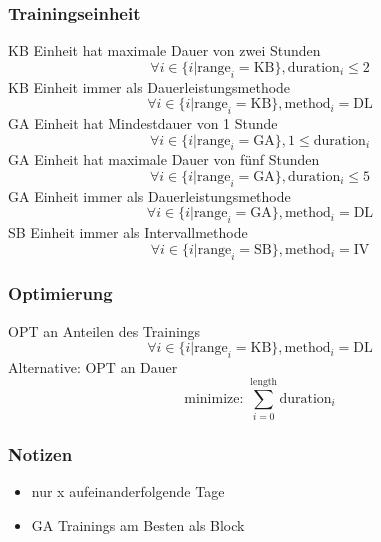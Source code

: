     \subsubsection{Trainingseinheit}
    KB Einheit hat maximale Dauer von zwei Stunden
        \begin{equation}
            \forall i \in \{i | \text{range}_i = \text{KB}\}, \text{duration}_i \leq 2
        \end{equation}
    KB Einheit immer als Dauerleistungsmethode
        \begin{equation}
            \forall i \in \{i | \text{range}_i = \text{KB}\}, \text{method}_i = \text{DL}
        \end{equation}
    GA Einheit hat Mindestdauer von 1 Stunde
        \begin{equation}
            \forall i \in \{i | \text{range}_i = \text{GA}\}, 1 \leq \text{duration}_i
        \end{equation}
    GA Einheit hat maximale Dauer von fünf Stunden
        \begin{equation}
            \forall i \in \{i | \text{range}_i = \text{GA}\}, \text{duration}_i \leq 5
        \end{equation}
    GA Einheit immer als Dauerleistungsmethode
        \begin{equation}
            \forall i \in \{i | \text{range}_i = \text{GA}\}, \text{method}_i = \text{DL}
        \end{equation}
    SB Einheit immer als Intervallmethode
        \begin{equation}
            \forall i \in \{i | \text{range}_i = \text{SB}\}, \text{method}_i = \text{IV}
        \end{equation}
        
    \subsubsection{Optimierung}
    OPT an Anteilen des Trainings 
        \begin{equation}
            \forall i \in \{i | \text{range}_i = \text{KB}\}, \text{method}_i = \text{DL}
        \end{equation}
    Alternative: OPT an Dauer 
        \begin{equation}
            \text{minimize: } \sum_{i=0}^{\text{length}} \text{duration}_i
        \end{equation}
    
    
    \subsubsection{Notizen}
        \begin{itemize}
            \item nur x aufeinanderfolgende Tage
            \item GA Trainings am Besten als Block \cite[34]{Radsporttraining}
        \end{itemize}